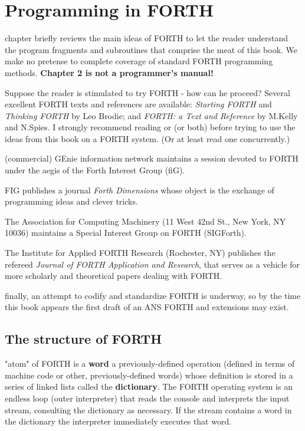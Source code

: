 ﻿\chapter{Programming in FORTH}
\startcontents[chapters]

 chapter briefly reviews the main ideas of FORTH to let the reader understand the program fragments and subroutines that comprise the meat of this book. We make no pretense to complete coverage of standard FORTH programming methods. \textbf{Chapter 2 is not a programmer’s manual!}

Suppose the reader is stimulated to try FORTH - how can he proceed? Several excellent FORTH texts and references are available: \textit{Starting FORTH}  and \textit{Thinking FORTH}  by Leo Brodie; and \textit{ FORTH: a Text and Reference}  by M.Kelly and N.Spies. I strongly recommend reading \FTR or \SF (or both) before trying to use the ideas from this book on a FORTH system. (Or at least read one concurrently.)

 (commercial) GEnie information network maintains a session devoted to FORTH under the aegis of the Forth Interest Group (fiG).

FIG publishes a journal \textit{Forth Dimensions} whose object is the exchange of programming ideas and clever tricks.

The Association for Computing Machinery (11 West 42nd St., New York, NY 10036) maintains a Special Interest Group on FORTH (SIGForth).

The Institute for Applied FORTH Research (Rochester, NY) publishes the refereed \textit{Journal of FORTH Application and Research}, that serves as a vehicle for more scholarly and theoretical papers dealing with FORTH.

finally, an attempt to codify and standardize FORTH is underway, so by the time this book appears the first draft of an ANS FORTH and extensions may exist.

\section{The structure of FORTH}

 "atom" of FORTH is a \textbf{word} a previously-defined operation (defined in terms of machine code or other, previously-defined words) whose definition is stored in a series of linked lists called the \textbf{dictionary}. The FORTH operating system is an endless loop (outer interpreter) that reads the console and interprets the input stream, consulting the dictionary as necessary. If the stream contains a word in the dictionary the interpreter immediately executes that word.

